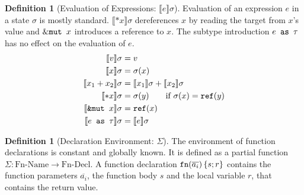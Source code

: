 \documentclass[twoside, english, final]{sdqthesis}
\newcommand{\set}[1]{\left\{ #1 \right\}}
\newcommand{\bbracket}[1]{\llbracket #1 \rrbracket}
\theoremstyle{definition}
\newtheorem{definition}[theorem]{Definition}
\begin{document}
\begin{definition}[Evaluation of Expressions: $\bbracket{e} \sigma$]
Evaluation of an expression $e$ in a state $\sigma$ is mostly standard. $\bbracket{*x}\sigma$ dereferences $x$ by reading the target from $x$'s value and $\&\code{mut } x$ introduces a reference to $x$. The subtype introduction $e \code{ as }\tau$ has no effect on the evaluation of $e$.
\begin{align*}
  \bbracket{v} \sigma &= v \\
  \bbracket{x} \sigma &= \sigma(x) \\
  \bbracket{x_1 + x_2} \sigma &= \bbracket{x_1} \sigma + \bbracket{x_2} \sigma \\
  \bbracket{*x} \sigma &= \sigma(y) \qquad \text{if } \sigma(x) = \code{ref}(y) \\
  \bbracket{\code{\&mut } x} \sigma &= \code{ref}(x) \\
  \bbracket{e \code{ as } \tau} \sigma &= \bbracket{e}\sigma \\
\end{align*}
\end{definition}
 

\begin{definition}[Declaration Environment: $\Sigma$]
  The environment of function declarations is constant and globally known. It is defined as a partial function $\Sigma : \text{Fn-Name} \to \text{Fn-Decl}$. A function declaration $\code{fn}(\overline{a_i}) \set{s; r}$ contains the function parameters $\overline{a_i}$, the function body $s$ and the local variable $r$, that contains the return value.
\end{definition}
\end{document}
